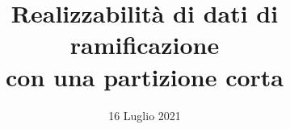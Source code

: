 \documentclass[10pt]{beamer}
\title{Realizzabilità di dati di ramificazione\\con una partizione corta}
\author[Filippo Gianni Baroni]{\usebox{\authorbox}}
\institute[UniPi]{\texttt{[image: img/unipi-logo]}\\Università di Pisa}
\date{16 Luglio 2021}
\begin{document}
\frame{\titlepage}




\end{document}
